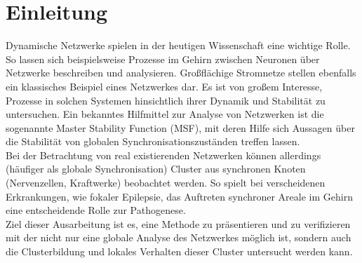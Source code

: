 \section{Einleitung}\label{einleitung}
Dynamische Netzwerke spielen in der heutigen Wissenschaft eine wichtige Rolle. So lassen sich beispielsweise Prozesse im Gehirn zwischen Neuronen über Netzwerke beschreiben und analysieren\cite{neuron}. Großflächige Stromnetze stellen ebenfalls ein klassisches Beispiel eines Netzwerkes dar\cite{power}. Es ist von großem Interesse, Prozesse in solchen Systemen hinsichtlich ihrer Dynamik und Stabilität zu untersuchen. Ein bekanntes Hilfmittel zur Analyse von Netzwerken ist die sogenannte Master Stability Function (MSF), mit deren Hilfe sich Aussagen über die Stabilität von globalen Synchronisationszuständen treffen lassen.\\
Bei der Betrachtung von real existierenden Netzwerken können allerdings (häufiger als globale Synchronisation) Cluster aus synchronen Knoten (Nervenzellen, Kraftwerke) beobachtet werden. So spielt bei verscheidenen Erkrankungen, wie fokaler Epilepsie, das Auftreten synchroner Areale im Gehirn eine entscheidende Rolle zur Pathogenese\cite{neuron}.\\
Ziel dieser Ausarbeitung ist es, eine Methode zu präsentieren und zu verifizieren mit der nicht nur eine globale Analyse des Netzwerkes möglich ist, sondern auch die Clusterbildung und lokales Verhalten dieser Cluster untersucht werden kann.